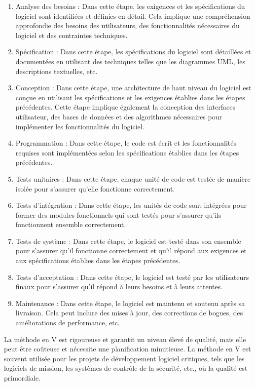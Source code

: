\begin{enumerate}
    \item Analyse des besoins : Dans cette étape, les exigences et les spécifications du logiciel sont identifiées et définies en détail. Cela implique une compréhension approfondie des besoins des utilisateurs, des fonctionnalités nécessaires du logiciel et des contraintes techniques.
    \item Spécification : Dans cette étape, les spécifications du logiciel sont détaillées et documentées en utilisant des techniques telles que les diagrammes UML, les descriptions textuelles, etc.
    \item Conception : Dans cette étape, une architecture de haut niveau du logiciel est conçue en utilisant les spécifications et les exigences établies dans les étapes précédentes. Cette étape implique également la conception des interfaces utilisateur, des bases de données et des algorithmes nécessaires pour implémenter les fonctionnalités du logiciel.
    \item Programmation : Dans cette étape, le code est écrit et les fonctionnalités requises sont implémentées selon les spécifications établies dans les étapes précédentes.
    \item Tests unitaires : Dans cette étape, chaque unité de code est testée de manière isolée pour s'assurer qu'elle fonctionne correctement.
    \item Tests d'intégration : Dans cette étape, les unités de code sont intégrées pour former des modules fonctionnels qui sont testés pour s'assurer qu'ils fonctionnent ensemble correctement.
    \item Tests de système : Dans cette étape, le logiciel est testé dans son ensemble pour s'assurer qu'il fonctionne correctement et qu'il répond aux exigences et aux spécifications établies dans les étapes précédentes.
    \item Tests d'acceptation : Dans cette étape, le logiciel est testé par les utilisateurs finaux pour s'assurer qu'il répond à leurs besoins et à leurs attentes.
    \item Maintenance : Dans cette étape, le logiciel est maintenu et soutenu après sa livraison. Cela peut inclure des mises à jour, des corrections de bogues, des améliorations de performance, etc.
\end{enumerate}
La méthode en V est rigoureuse et garantit un niveau élevé de qualité, mais elle peut être coûteuse et nécessite une planification minutieuse. La méthode en V est souvent utilisée pour les projets de développement logiciel critiques, tels que les logiciels de mission, les systèmes de contrôle de la sécurité, etc., où la qualité est primordiale.


